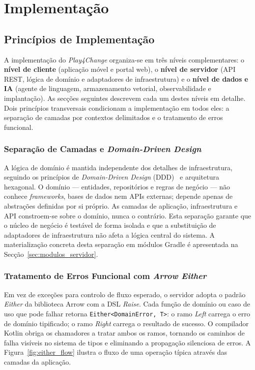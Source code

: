 %
%
\chapter{Implementação}
\label{cha:implementacao}

\section{Princípios de Implementação}
\label{sec:principios_implementacao}

A implementação do \textit{Play4Change} organiza-se em três níveis complementares: o \textbf{nível de cliente} (aplicação móvel e portal web), o \textbf{nível de servidor} (API REST, lógica de domínio e adaptadores de infraestrutura) e o \textbf{nível de dados e IA} (agente de linguagem, armazenamento vetorial, observabilidade e implantação). As secções seguintes descrevem cada um destes níveis em detalhe. Dois princípios transversais condicionam a implementação em todos eles: a separação de camadas por contextos delimitados e o tratamento de erros funcional.

\subsection*{Separação de Camadas e \textit{Domain-Driven Design}}

A lógica de domínio é mantida independente dos detalhes de infraestrutura, seguindo os princípios de \textit{Domain-Driven Design} (DDD)~\cite{evans2003ddd} e arquitetura hexagonal. O domínio --- entidades, repositórios e regras de negócio --- não conhece \textit{frameworks}, bases de dados nem APIs externas; depende apenas de abstrações definidas por si próprio. As camadas de aplicação, infraestrutura e API constroem-se sobre o domínio, nunca o contrário. Esta separação garante que o núcleo de negócio é testável de forma isolada e que a substituição de adaptadores de infraestrutura não afeta a lógica central do sistema. A materialização concreta desta separação em módulos Gradle é apresentada na Secção~\ref{sec:modulos_servidor}.

\subsection*{Tratamento de Erros Funcional com \textit{Arrow Either}}

Em vez de exceções para controlo de fluxo esperado, o servidor adopta o padrão \textit{Either} da biblioteca Arrow com a DSL \textit{Raise}. Cada função de domínio ou caso de uso que pode falhar retorna \texttt{Either<DomainError,~T>}: o ramo \textit{Left} carrega o erro de domínio tipificado; o ramo \textit{Right} carrega o resultado de sucesso. O compilador Kotlin obriga os chamadores a tratar ambos os ramos, tornando os caminhos de falha visíveis no sistema de tipos e eliminando a propagação silenciosa de erros. A Figura~\ref{fig:either_flow} ilustra o fluxo de uma operação típica através das camadas da aplicação.

